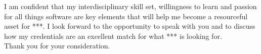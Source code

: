 \documentclass[11pt, a4paper]{awesome-cv}
\begin{document}
\begin{cvletter}
I am confident that my interdisciplinary skill set, willingness to learn and passion for all things software are key elements that will help me become a resourceful asset for ***. I look forward to the opportunity to speak with you and to discuss how my credentials are an excellent match for what *** is looking for.\\

Thank you for your consideration.\\

\vspace{-4.5mm}

\end{cvletter}


\makeletterclosing
\end{document}
